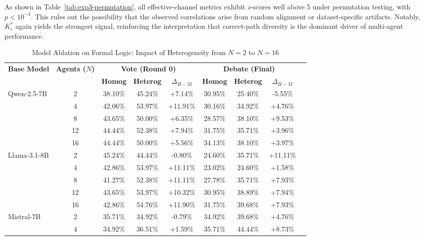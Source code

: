 \documentclass{article}
\theoremstyle{plain}
\theoremstyle{definition}
\theoremstyle{remark}
\begin{document}
As shown in Table~\ref{tab:exp3-permutation}, all effective-channel metrics exhibit
$z$-scores well above 5 under permutation testing, with $p<10^{-3}$.
This rules out the possibility that the observed correlations arise from random
alignment or dataset-specific artifacts.
Notably, $K^*_c$ again yields the strongest signal, reinforcing the interpretation
that correct-path diversity is the dominant driver of multi-agent performance.


\begin{table}[t]
\centering
\caption{Model Ablation on Formal Logic: Impact of Heterogeneity from $N=2$ to $N=16$}
\label{tab:logic_full_ablation}
\small
\begin{tabular}{lcccccccc}
\toprule
\multirow{2}{*}{\textbf{Base Model}} & \multirow{2}{*}{\textbf{Agents ($N$)}} & \multicolumn{3}{c}{\textbf{Vote (Round 0)}} & \multicolumn{3}{c}{\textbf{Debate (Final)}} \\
\cmidrule(lr){3-5} \cmidrule(lr){6-8}
 &  & \textbf{Homog} & \textbf{Heterog} & \textbf{$\Delta_{H-M}$} & \textbf{Homog} & \textbf{Heterog} & \textbf{$\Delta_{H-M}$} \\
\midrule
\multirow{5}{*}{Qwen-2.5-7B} 
 & 2  & 38.10\% & 45.24\% & +7.14\% & 30.95\% & 25.40\% & -5.55\% \\
 & 4  & 42.06\% & 53.97\% & +11.91\% & 30.16\% & 34.92\% & +4.76\% \\
 & 8  & 43.65\% & 50.00\% & +6.35\% & 28.57\% & 38.10\% & +9.53\% \\
 & 12 & 44.44\% & 52.38\% & +7.94\% & 31.75\% & 35.71\% & +3.96\% \\
 & 16 & 44.44\% & 50.00\% & +5.56\% & 34.13\% & 38.10\% & +3.97\% \\
\midrule
\multirow{5}{*}{Llama-3.1-8B} 
 & 2  & 45.24\% & 44.44\% & -0.80\% & 24.60\% & 35.71\% & +11.11\% \\
 & 4  & 42.86\% & 53.97\% & +11.11\% & 23.02\% & 24.60\% & +1.58\% \\
 & 8  & 41.27\% & 52.38\% & +11.11\% & 27.78\% & 35.71\% & +7.93\% \\
 & 12 & 43.65\% & 53.97\% & +10.32\% & 30.95\% & 38.89\% & +7.94\% \\
 & 16 & 42.86\% & 54.76\% & +11.90\% & 31.75\% & 39.68\% & +7.93\% \\
\midrule
\multirow{5}{*}{Mistral-7B} 
 & 2  & 35.71\% & 34.92\% & -0.79\% & 34.92\% & 39.68\% & +4.76\% \\
 & 4  & 34.92\% & 36.51\% & +1.59\% & 35.71\% & 44.44\% & +8.73\% \\

\end{tabular}
\end{table}
\end{document}
